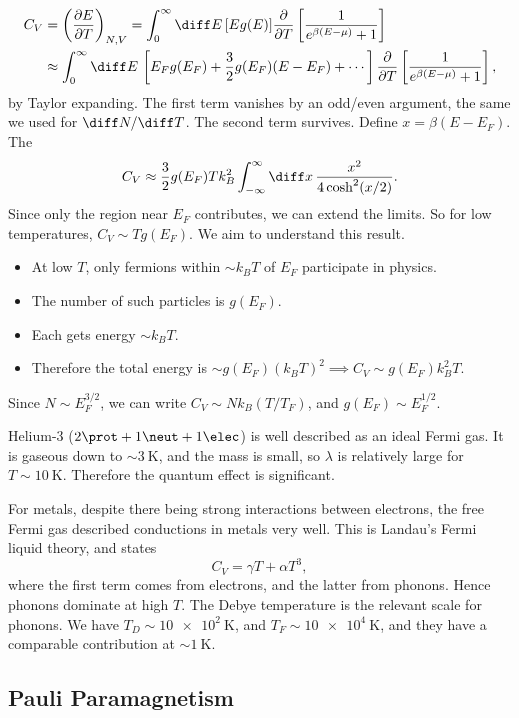 \documentclass[12pt]{article}
\begin{document}
\begin{align*}
	C_V &= \left( \frac{\partial E}{\partial T} \right)_{N, V} = \int_0^\infty \diff E \, [E g(E)] \frac{\partial}{\partial T} \left[ \frac{1}{e^{\beta(E - \mu)} + 1} \right] \\
	    &\approx \int_0^\infty \diff E \, \left[ E_F g(E_F) + \frac{3}{2} g(E_F) (E - E_F) + \cdots \right] \frac{\partial}{\partial T} \left[ \frac{1}{e^{\beta(E - \mu)} + 1} \right],
\end{align*}
by Taylor expanding. The first term vanishes by an odd/even argument, the same we used for $\diff N / \diff T$. The second term survives. Define $x = \beta(E - E_F)$. The
\[
C_V \approx \frac{3}{2} g(E_F) T k_B^2 \int_{-\infty}^{\infty} \diff x \, \frac{x^2}{4 \cosh^2(x/2)}.
\]
Since only the region near $E_F$ contributes, we can extend the limits. So for low temperatures, $C_V \sim T g(E_F)$. We aim to understand this result.
\begin{itemize}
	\item At low $T$, only fermions within $\sim k_B T$ of $E_F$ participate in physics.
	\item The number of such particles is $g(E_F)$.
	\item Each gets energy $\sim k_B T$.
	\item Therefore the total energy is $\sim g(E_F) (k_B T)^2 \implies C_V \sim g(E_F) k_B^2 T$.
\end{itemize}

Since $N \sim E_F^{3/2}$, we can write $C_V \sim N k_B (T/T_F)$, and $g(E_F) \sim E_F^{1/2}$.

Helium-3 ($2 \prot + 1 \neut + 1 \elec$) is well described as an ideal Fermi gas. It is gaseous down to $\sim \qty{3}{\kelvin}$, and the mass is small, so $\lambda$ is relatively large for $T \sim \qty{10}{\kelvin}$. Therefore the quantum effect is significant.

For metals, despite there being strong interactions between electrons, the free Fermi gas described conductions in metals very well. This is Landau's Fermi liquid theory, and states
\[
C_V = \gamma T + \alpha T^3,
\]
where the first term comes from electrons, and the latter from phonons. Hence phonons dominate at high $T$. The Debye temperature is the relevant scale for phonons. We have $T_D \sim \qty{10e2}{\kelvin}$, and $T_F \sim \qty{10e4}{\kelvin}$, and they have a comparable contribution at $\sim \qty{1}{\kelvin}$.


\subsection{Pauli Paramagnetism}
\label{sub:pp}
\end{document}
